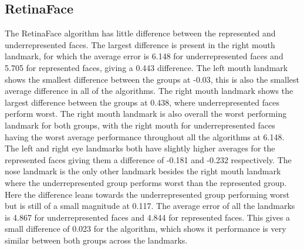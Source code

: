 \documentclass{l4proj}
\begin{document}
\subsection{RetinaFace}
The RetinaFace algorithm has little difference between the represented and underrepresented faces. The largest difference is present in the right mouth landmark, for which the average error is 6.148 for underrepresented faces and 5.705 for represented faces, giving a 0.443 difference. The left mouth landmark shows the smallest difference between the groups at -0.03, this is also the smallest average difference in all of the algorithms. The right mouth landmark shows the largest difference between the groups at 0.438, where underrepresented faces perform worst. The right mouth landmark is also overall the worst performing landmark for both groups, with the right mouth for underrepresented faces having the worst average performance throughout all the algorithms at 6.148. The left and right eye landmarks both have slightly higher averages for the represented faces giving them a difference of -0.181 and -0.232 respectively. The nose landmark is the only other landmark besides the right mouth landmark where the underrepresented group performs worst than the represented group. Here the difference leans towards the underrepresented group performing worst but is still of a small magnitude at 0.117. The average error of all the landmarks is 4.867 for underrepresented faces and 4.844 for represented faces. This gives a small difference of 0.023 for the algorithm, which shows it performance is very similar between both groups across the landmarks. 
\end{document}

